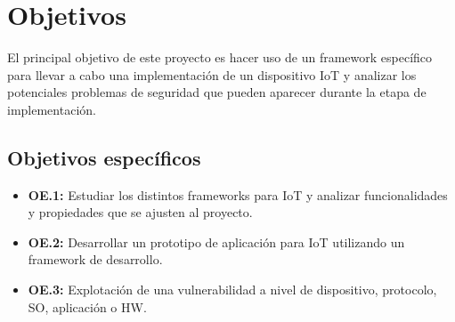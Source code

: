 {\section{Objetivos} \label{sec:objetivos}

El principal objetivo de este proyecto es hacer uso de un framework específico para llevar a cabo una implementación de un dispositivo IoT y analizar los potenciales problemas de seguridad que pueden aparecer durante la etapa de implementación.

\subsection{Objetivos específicos}

\begin{itemize}
    \item \textbf{OE.1:} Estudiar los distintos frameworks para IoT y analizar funcionalidades y propiedades que se ajusten al proyecto.
    \item \textbf{OE.2:} Desarrollar un prototipo de aplicación para IoT utilizando un framework de desarrollo.
    \item \textbf{OE.3:} Explotación de una vulnerabilidad a nivel de dispositivo, protocolo, SO, aplicación o HW.
\end{itemize}

}